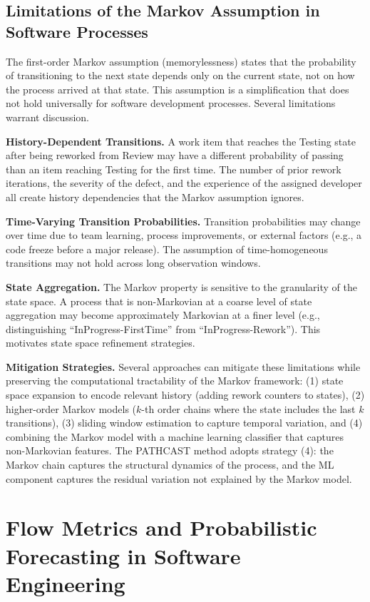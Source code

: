 \subsection{Limitations of the Markov Assumption in Software Processes}
\label{sec:markov-limitations}

The first-order Markov assumption (memorylessness) states that the
probability of transitioning to the next state depends only on the
current state, not on how the process arrived at that state. This
assumption is a simplification that does not hold universally for
software development processes. Several limitations warrant discussion.

\textbf{History-Dependent Transitions.} A work item that reaches the
Testing state after being reworked from Review may have a different
probability of passing than an item reaching Testing for the first time.
The number of prior rework iterations, the severity of the defect, and
the experience of the assigned developer all create history dependencies
that the Markov assumption ignores.

\textbf{Time-Varying Transition Probabilities.} Transition probabilities
may change over time due to team learning, process improvements, or
external factors (e.g., a code freeze before a major release). The
assumption of time-homogeneous transitions may not hold across long
observation windows.

\textbf{State Aggregation.} The Markov property is sensitive to the
granularity of the state space. A process that is non-Markovian at a
coarse level of state aggregation may become approximately Markovian
at a finer level (e.g., distinguishing ``InProgress-FirstTime'' from
``InProgress-Rework''). This motivates state space refinement strategies.

\textbf{Mitigation Strategies.} Several approaches can mitigate these
limitations while preserving the computational tractability of the
Markov framework: (1) state space expansion to encode relevant history
(adding rework counters to states), (2) higher-order Markov models
($k$-th order chains where the state includes the last $k$ transitions),
(3) sliding window estimation to capture temporal variation, and
(4) combining the Markov model with a machine learning classifier that
captures non-Markovian features. The PATHCAST method adopts
strategy (4): the Markov chain captures the structural dynamics of the
process, and the ML component captures the residual variation not
explained by the Markov model.

\section{Flow Metrics and Probabilistic Forecasting in Software Engineering}
\label{sec:flow-metrics}

